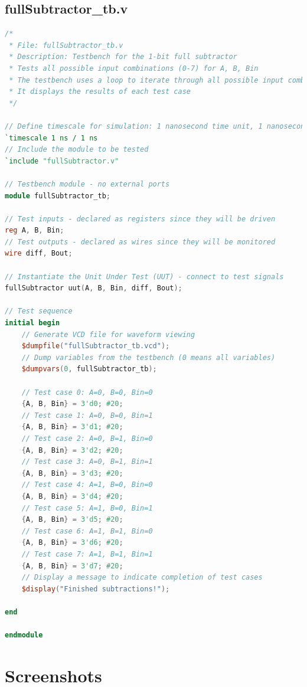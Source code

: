 \documentclass[a4paper,12pt]{article}
\begin{document}
\newpage

\subsection*{fullSubtractor\_tb.v}
\begin{lstlisting}[language=Verilog]
/*
 * File: fullSubtractor_tb.v
 * Description: Testbench for the 1-bit full subtractor
 * Tests all possible input combinations (0-7) for A, B, Bin
 * The testbench uses a loop to iterate through all possible input combinations
 * It displays the results of each test case
 */
 
// Define timescale for simulation: 1 nanosecond time unit, 1 nanosecond precision
`timescale 1 ns / 1 ns
// Include the module to be tested
`include "fullSubtractor.v"

// Testbench module - no external ports
module fullSubtractor_tb;

// Test inputs - declared as registers since they will be driven
reg A, B, Bin;
// Test outputs - declared as wires since they will be monitored
wire diff, Bout;

// Instantiate the Unit Under Test (UUT) - connect to test signals
fullSubtractor uut(A, B, Bin, diff, Bout);

// Test sequence
initial begin
    // Generate VCD file for waveform viewing
    $dumpfile("fullSubtractor_tb.vcd");
    // Dump variables from the testbench (0 means all variables)
    $dumpvars(0, fullSubtractor_tb);
    
    // Test case 0: A=0, B=0, Bin=0
    {A, B, Bin} = 3'd0; #20;
    // Test case 1: A=0, B=0, Bin=1
    {A, B, Bin} = 3'd1; #20;
    // Test case 2: A=0, B=1, Bin=0
    {A, B, Bin} = 3'd2; #20;
    // Test case 3: A=0, B=1, Bin=1
    {A, B, Bin} = 3'd3; #20;
    // Test case 4: A=1, B=0, Bin=0
    {A, B, Bin} = 3'd4; #20;
    // Test case 5: A=1, B=0, Bin=1
    {A, B, Bin} = 3'd5; #20;
    // Test case 6: A=1, B=1, Bin=0
    {A, B, Bin} = 3'd6; #20;
    // Test case 7: A=1, B=1, Bin=1
    {A, B, Bin} = 3'd7; #20;
    // Display a message to indicate completion of test cases
    $display("Finished subtractions!");
    
end

endmodule
\end{lstlisting}

\section*{Screenshots}
\end{document}
